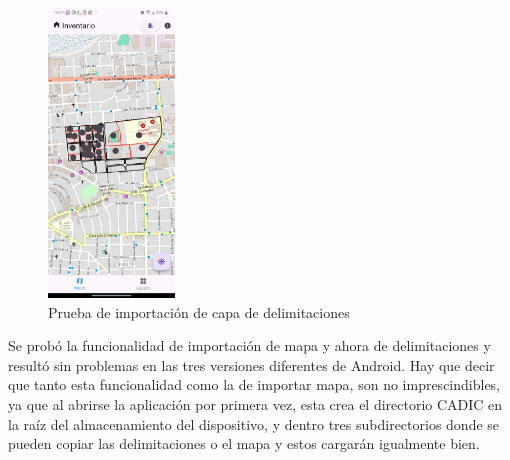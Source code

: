 \begin{figure}[h]
    \includegraphics[width=0.3\textwidth]{Graphics/Capitulo 4/LG Android 13/4.3/1.png}
    \caption{Prueba de importación de capa de delimitaciones}
    \label{fig:figura21}
\end{figure}
Se probó la funcionalidad de importación de mapa y ahora de delimitaciones y resultó sin problemas en las tres versiones diferentes de Android. Hay que decir que tanto esta funcionalidad
como la de importar mapa, son no imprescindibles, ya que al abrirse la aplicación por primera vez, esta crea el directorio CADIC en la raíz del almacenamiento
del dispositivo, y dentro tres subdirectorios donde se pueden copiar las delimitaciones o el mapa y estos cargarán igualmente bien.

\pagebreak
